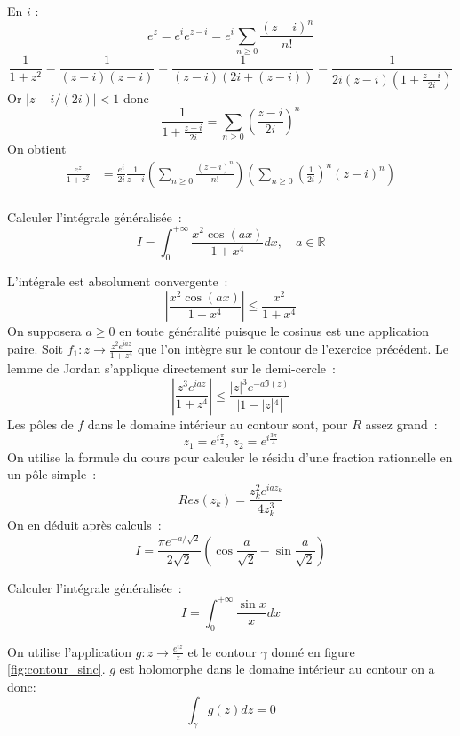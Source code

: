 \documentclass[a4paper, 12pt]{amsart}
\begin{document}
En $i$ : 
\[ 
    e^z = e^i e^{z-i} = e^i \sum_{n \geq 0} \frac{(z-i)^n}{n!} 
\] 
\[ 
    \frac{1}{1+z^2} = \frac{1}{(z-i)(z+i)} =  
    \frac{1}{(z-i)(2i+(z-i))} = \frac{1}{2i(z-i)(1+\frac{z-i}{2i})} 
\] 
Or $|z-i/(2i)| < 1 $ donc 
\[
    \frac{1}{1+\frac{z-i}{2i}} = \sum_{n \geq 0} \left( \frac{z-i}{2i} \right) ^ n 
\]
On obtient 
\begin{align*} 
    \frac{e^z}{1+z^2} 
    &= \frac{e^i}{2i} \frac{1}{z-i} \left( \sum_{n \geq 0} \frac{(z-i)^n}{n!} \right) \left( \sum_{n \geq 0} \left( \frac{1}{2i} \right) ^ n (z-i)^n \right) \\ 
\end{align*} 

\begin{fex}
 Calculer l'intégrale généralisée~:
\[
I = \int_0^{+\infty} \frac{x^2 \cos(ax)}{1+x^4} dx , \quad a \in
\mathbb{R}
\]
\end{fex} 
L'intégrale est absolument convergente~:
\[
\left |  \frac{x^2 \cos(ax)}{1+x^4} \right | \leq \frac{x^2}{1+x^4}
\]
On supposera $a\geq0$ en toute généralité puisque le cosinus est une application
paire.
Soit $f_1 : z \to \frac{z^2 e^{iaz}}{1+z^4}$ que l'on intègre sur le contour
de l'exercice précédent.
Le lemme de Jordan s'applique directement sur le demi-cercle~:
\[
\left |
\frac{z^3 e^{iaz}}{1+z^4} 
\right | \leq \frac{|z|^3 e^{-a \Im(z)}}{|1-|z|^4|}
\]
Les pôles de $f$ dans le domaine intérieur au contour sont, pour $R$ assez
grand~:
\[
z_1 = e^{i\frac{\pi}{4}}, \, z_2 = e^{i\frac{3\pi}{4}}
\]
On utilise la formule du cours pour calculer le résidu d'une fraction
rationnelle en un pôle simple~: 
\[
Res(z_k) = \frac{z_k^2 e^{ia z_k}}{4 z_k^3}
\]
On en déduit après calculs~:
\[
I = \frac{\pi e^{-a/\sqrt{2}}}{2\sqrt{2}} \left (
\cos\frac{a}{\sqrt{2}} - \sin \frac{a}{\sqrt{2}} \right )
\]

\begin{fex}
 Calculer l'intégrale généralisée~:
\[
I = \int_0^{+\infty} \frac{ \sin x}{x}dx
\]
\end{fex}
On utilise l'application $g : z \to \frac{e^{iz}}{z}$ et le contour $\gamma$ donné en
figure \ref{fig:contour_sinc}. 
$g$ est
holomorphe dans le domaine intérieur au contour on a donc:
\[
\int_{\gamma} g(z) dz = 0
\]
\end{document}
